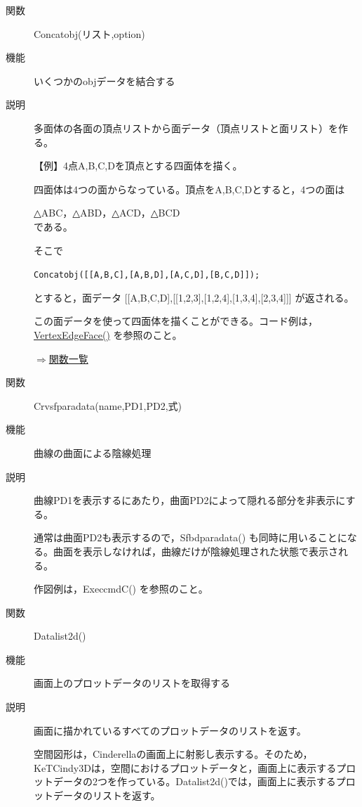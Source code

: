\documentclass[papersize,a4paper,12pt,uplatex]{jsarticle}
\begin{document}
\begin{description}
\hypertarget{concatobj}{}    
\item[関数]  Concatobj(リスト,option)
\item[機能]  いくつかのobjデータを結合する
\item[説明]  多面体の各面の頂点リストから面データ（頂点リストと面リスト）を作る。

\vspace{\baselineskip}
【例】4点A,B,C,Dを頂点とする四面体を描く。

四面体は4つの面からなっている。頂点をA,B,C,Dとすると，4つの面は
  
              △ABC，△ABD，△ACD，△BCD\\
である。
  
        \begin{center}  \end{center}
  
そこで
  
    \verb|Concatobj([[A,B,C],[A,B,D],[A,C,D],[B,C,D]]);|
    
とすると，面データ  [[A,B,C,D],[[1,2,3],[1,2,4],[1,3,4],[2,3,4]]]   が返される。
  
この面データを使って四面体を描くことができる。コード例は，\hyperlink{vertexedgeface}{VertexEdgeFace()} を参照のこと。

\begin{flushright} \hyperlink{functionlist}{$\Rightarrow$関数一覧}\end{flushright}

\hypertarget{crvsfparadata}{}
\item[関数]  Crvsfparadata(name,PD1,PD2,式)
\item[機能]  曲線の曲面による陰線処理
\item[説明]  曲線PD1を表示するにあたり，曲面PD2によって隠れる部分を非表示にする。

通常は曲面PD2も表示するので，Sfbdparadata() も同時に用いることになる。曲面を表示しなければ，曲線だけが陰線処理された状態で表示される。

作図例は，ExeccmdC() を参照のこと。

\vspace{\baselineskip}
\hypertarget{datalist}{}    
\item[関数]  Datalist2d()
\item[機能]  画面上のプロットデータのリストを取得する
\item[説明]  画面に描かれているすべてのプロットデータのリストを返す。

空間図形は，Cinderellaの画面上に射影し表示する。そのため，KeTCindy3Dは，空間におけるプロットデータと，画面上に表示するプロットデータの2つを作っている。Datalist2d()では，画面上に表示するプロットデータのリストを返す。


\end{description}
\end{document}
